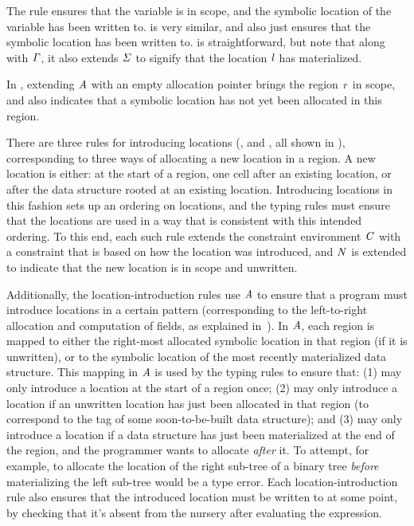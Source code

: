 \documentclass[showabstract,showacknowledgments,showpreface,showdedication]{iuphd}
\theoremstyle{nonumberplain}
\begin{document}
The \textsc{\tvar} rule ensures that the variable is in scope, and
the symbolic location of the variable has been written to.
%
\textsc{\tconcreteloc} is very similar, and also just ensures that
the symbolic location has been written to.
%
\textsc{\tlet} is straightforward, but note that along with $\mathit{\Gamma}$,
it also extends $\mathit{\Sigma}$ to signify that the location $\mathit{l}$ has
materialized.

In \textsc{\tlregion}, extending $\mathit{A}$ with an empty allocation pointer
brings the region $\mathit{r}$ in scope, and also indicates that
a symbolic location has not yet been allocated in this region.

There are three rules for introducing locations
(\textsc{\tllstart}, \textsc{\tlltag} and \textsc{\tllafter}, all shown in ),
corresponding to three ways of allocating a new location in a
region. A new location is either: at the start of a region, one cell
after an existing location, or after the data structure rooted at an
existing location. Introducing locations in this fashion sets up an
ordering on locations, and the typing rules must ensure that the
locations are used in a way that is consistent with this intended
ordering.
%
To this end, each such rule extends the constraint environment $\mathit{C}$
with a constraint that is based on how the location was introduced,
and $\mathit{N}$ is extended to indicate that the new location is in scope
and unwritten.

Additionally, the location-introduction rules use $\mathit{A}$ to ensure that a program
must introduce locations in a certain pattern (corresponding to the
left-to-right allocation and computation of fields, as explained
in~).
%
In $\mathit{A}$, each region is mapped to either the right-most allocated
symbolic location in that region (if it is unwritten), or to the
symbolic location of the most recently materialized data structure.
This mapping in $\mathit{A}$ is used by the typing rules to ensure that:
%
(1) \textsc{\tllstart} may only introduce a location at the start
of a region once;
%
(2) \textsc{\tlltag} may only introduce a location if an unwritten location has
just been allocated in that region (to correspond to the tag of some
soon-to-be-built data structure); and
%
(3) \textsc{\tllafter} may only introduce a location if a data structure has
just been materialized at the end of the region, and the programmer wants to
allocate \emph{after} it. To attempt, for example, to allocate the location of
the right sub-tree of a binary tree \emph{before} materializing the left sub-tree would
be a type error.
%
{Each location-introduction rule also ensures that the
introduced location must be written to at some point, by checking that
it's absent from the nursery after evaluating the expression.}
\end{document}
